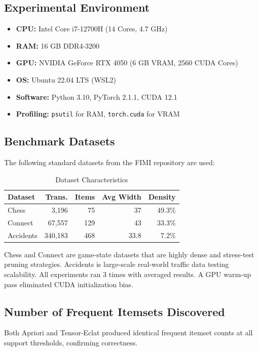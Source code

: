 \documentclass[conference]{IEEEtran}
\begin{document}
\subsection{Experimental Environment}
\begin{itemize}
    \item \textbf{CPU:} Intel Core i7-12700H (14 Cores, 4.7 GHz)
    \item \textbf{RAM:} 16 GB DDR4-3200
    \item \textbf{GPU:} NVIDIA GeForce RTX 4050 (6 GB VRAM, 2560 CUDA Cores)
    \item \textbf{OS:} Ubuntu 22.04 LTS (WSL2)
    \item \textbf{Software:} Python 3.10, PyTorch 2.1.1, CUDA 12.1
    \item \textbf{Profiling:} \texttt{psutil} for RAM, \texttt{torch.cuda} for VRAM
\end{itemize}

\subsection{Benchmark Datasets}
The following standard datasets from the FIMI repository are used:

\begin{table}[htbp]
\caption{Dataset Characteristics}
\centering
\begin{tabular}{@{}lrrrr@{}}
\toprule
\textbf{Dataset} & \textbf{Trans.} & \textbf{Items} & \textbf{Avg Width} & \textbf{Density} \\ \midrule
Chess & 3,196 & 75 & 37 & 49.3\% \\
Connect & 67,557 & 129 & 43 & 33.3\% \\
Accidents & 340,183 & 468 & 33.8 & 7.2\% \\ \bottomrule
\end{tabular}
\label{tab:datasets}
\end{table}

Chess and Connect are game-state datasets that are highly dense and stress-test pruning strategies. Accidents is large-scale real-world traffic data testing scalability. All experiments ran 3 times with averaged results. A GPU warm-up pass eliminated CUDA initialization bias.

\subsection{Number of Frequent Itemsets Discovered}
Both Apriori and Tensor-Eclat produced identical frequent itemset counts at all support thresholds, confirming correctness.
\end{document}
